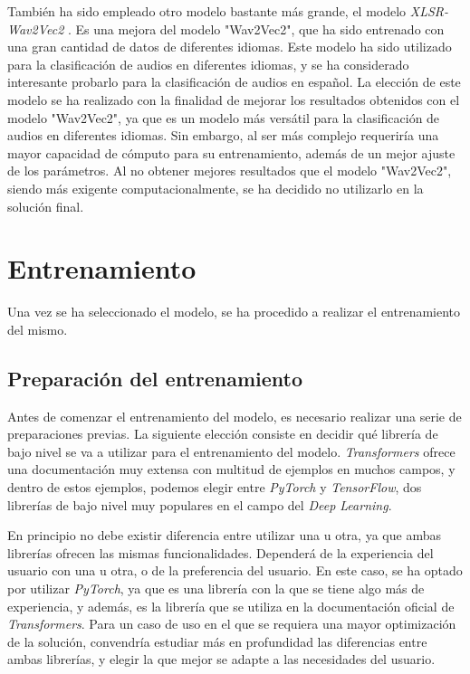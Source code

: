 También ha sido empleado otro modelo bastante más grande, el modelo \textit{XLSR-Wav2Vec2} \cite{conneau2020unsupervised}.
Es una mejora del modelo "Wav2Vec2", que ha sido entrenado con una gran cantidad de datos de diferentes idiomas.
Este modelo ha sido utilizado para la clasificación de audios en diferentes idiomas, y se ha considerado interesante probarlo para la clasificación de audios en español.
La elección de este modelo se ha realizado con la finalidad de mejorar los resultados obtenidos con el modelo "Wav2Vec2", ya que es un modelo más versátil para la clasificación de audios en diferentes idiomas. \cite{greekEmotionRecognition}
Sin embargo, al ser más complejo requeriría una mayor capacidad de cómputo para su entrenamiento, además de un mejor ajuste de los parámetros.
Al no obtener mejores resultados que el modelo "Wav2Vec2", siendo más exigente computacionalmente, se ha decidido no utilizarlo en la solución final.


\section{Entrenamiento}\label{seccion:entrenamiento}
Una vez se ha seleccionado el modelo, se ha procedido a realizar el entrenamiento del mismo.

\subsection{Preparación del entrenamiento}\label{seccion:preparacion-del-entrenamiento}
Antes de comenzar el entrenamiento del modelo, es necesario realizar una serie de preparaciones previas.
La siguiente elección consiste en decidir qué librería de bajo nivel se va a utilizar para el entrenamiento del modelo.
\textit{Transformers} ofrece una documentación muy extensa con multitud de ejemplos en muchos campos, y dentro de estos ejemplos, podemos elegir entre \textit{PyTorch} y \textit{TensorFlow}, dos librerías de bajo nivel muy populares en el campo del \textit{Deep Learning}.

En principio no debe existir diferencia entre utilizar una u otra, ya que ambas librerías ofrecen las mismas funcionalidades.
Dependerá de la experiencia del usuario con una u otra, o de la preferencia del usuario.
En este caso, se ha optado por utilizar \textit{PyTorch}, ya que es una librería con la que se tiene algo más de experiencia, y además, es la librería que se utiliza en la documentación oficial de \textit{Transformers}.
Para un caso de uso en el que se requiera una mayor optimización de la solución, convendría estudiar más en profundidad las diferencias entre ambas librerías, y elegir la que mejor se adapte a las necesidades del usuario.

